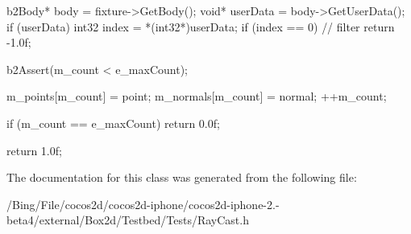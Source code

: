 \begin{DoxyCode}
        {
                b2Body* body = fixture->GetBody();
                void* userData = body->GetUserData();
                if (userData)
                {
                        int32 index = *(int32*)userData;
                        if (index == 0)
                        {
                                // filter
                                return -1.0f;
                        }
                }

                b2Assert(m_count < e_maxCount);

                m_points[m_count] = point;
                m_normals[m_count] = normal;
                ++m_count;

                if (m_count == e_maxCount)
                {
                        return 0.0f;
                }

                return 1.0f;
        }
\end{DoxyCode}


The documentation for this class was generated from the following file\-:\begin{DoxyCompactItemize}
\item 
/\-Bing/\-File/cocos2d/cocos2d-\/iphone/cocos2d-\/iphone-\/2.-\/beta4/external/\-Box2d/\-Testbed/\-Tests/Ray\-Cast.\-h\end{DoxyCompactItemize}
